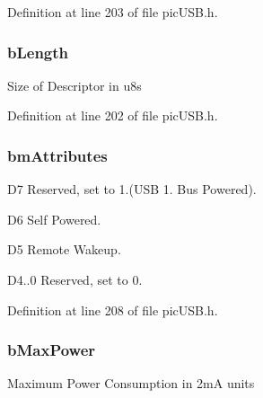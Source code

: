 Definition at line 203 of file pic\-U\-S\-B.\-h.

\hypertarget{struct_u_s_b___configuration___descriptor___header_a904ce9aea3e1db94a9a1ec5a0a22b65d}{
\subsubsection[{b\-Length}]{ b\-Length}}\label{struct_u_s_b___configuration___descriptor___header_a904ce9aea3e1db94a9a1ec5a0a22b65d}
Size of Descriptor in u8s 

Definition at line 202 of file pic\-U\-S\-B.\-h.

\hypertarget{struct_u_s_b___configuration___descriptor___header_a2733c047911192e6e1630eb85167cd42}{
\subsubsection[{bm\-Attributes}]{ bm\-Attributes}}\label{struct_u_s_b___configuration___descriptor___header_a2733c047911192e6e1630eb85167cd42}

\begin{DoxyItemize}
\item D7 Reserved, set to 1.(U\-S\-B 1. Bus Powered).
\item D6 Self Powered.
\item D5 Remote Wakeup.
\item D4..0 Reserved, set to 0.
\end{DoxyItemize}

Definition at line 208 of file pic\-U\-S\-B.\-h.

\hypertarget{struct_u_s_b___configuration___descriptor___header_a4ff1fe48c47528b125bf17b470c5af44}{
\subsubsection[{b\-Max\-Power}]{ b\-Max\-Power}}\label{struct_u_s_b___configuration___descriptor___header_a4ff1fe48c47528b125bf17b470c5af44}
Maximum Power Consumption in 2m\-A units 

